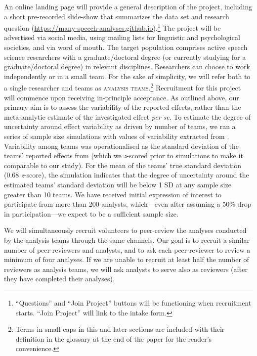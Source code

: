\documentclass[Review,times,sageh]{sagej}
\begin{document}
An online landing page will provide a general description of the project, including a short pre-recorded slide-show that summarizes the data set and research question (\url{https://many-speech-analyses.github.io}).\footnote{``Questions'' and ``Join Project'' buttons will be functioning when recruitment starts. ``Join Project'' will link to the intake form.}
The project will be advertised via social media, using mailing lists for linguistic and psychological societies, and via word of mouth.
The target population comprises active speech science researchers with a graduate/doctoral degree (or currently studying for a graduate/doctoral degree) in relevant disciplines.
Researchers can choose to work independently or in a small team.
For the sake of simplicity, we will refer both to a single researcher and teams as \textsc{analysis teams}.\footnote{Terms in small caps in this and later sections are included with their definition in the glossary at the end of the paper for the reader's convenience.}
Recruitment for this project will commence upon receiving in-principle acceptance.
As outlined above, our primary aim is to assess the variability of the reported effects, rather than the meta-analytic estimate of the investigated effect \emph{per se}.
To estimate the degree of uncertainty around effect variability as driven by number of teams, we ran a series of sample size simulations with values of variability extracted from \citet{silberzahn2018many}.
Variability among teams was operationalised as the standard deviation of the teams' reported effects from \citet{silberzahn2018many} (which we \emph{z}-scored prior to simulations to make it comparable to our study).
For the mean of the teams' true standard deviation (0.68 \emph{z}-score), the simulation indicates that the degree of uncertainty around the estimated teams' standard deviation will be below 1 SD at any sample size greater than 10 teams.
We have received initial expression of interest to participate from more than 200 analysts, which---even after assuming a 50\% drop in participation---we expect to be a sufficient sample size.

We will simultaneously recruit volunteers to peer-review the analyses conducted by the analysis teams through the same channels.
Our goal is to recruit a similar number of peer-reviewers and analysts, and to ask each peer-reviewer to review a minimum of four analyses.
If we are unable to recruit at least half the number of reviewers as analysis teams, we will ask analysts to serve also as reviewers (after they have completed their analyses).
\end{document}
